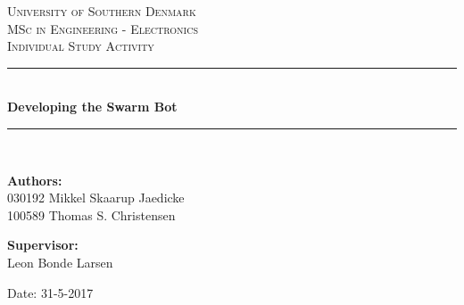 \begin{titlepage}
\begin{center}

\textsc{\LARGE University of Southern Denmark}\\[1.5cm]
\textsc{\Large MSc in Engineering - Electronics}\\
\textsc{\large Individual Study Activity}\\[0.5cm]

\vfill
\vspace{3cm}
\hrule ~\\[0.3cm]
{ \LARGE \bfseries Developing the Swarm Bot\\[0.4cm] }
\hrule ~\\[1.5cm]

\vfill

\vspace{5cm}
\begin{minipage}[t]{.55\textwidth}
\begin{flushleft} \large
\textbf{Authors:}\\
030192 Mikkel Skaarup Jaedicke\\
100589 Thomas S. Christensen
\end{flushleft}
\end{minipage}
\begin{minipage}[t]{.44\textwidth}
\begin{flushright} \large
\textbf{Supervisor:} \\
Leon Bonde Larsen
\end{flushright}
\end{minipage}

\vspace{1cm}
Date: 31-5-2017

\vspace{1cm}

\end{center}
\end{titlepage}